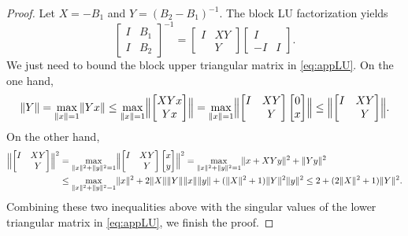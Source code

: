 \documentclass[10pt,a4paper]{amsart}
\providecommand{\Bignorm}[1]{\Bigl\lVert#1\Bigr\rVert}
\providecommand{\norm}[1]{\lVert#1\rVert}
\begin{document}
\begin{proof}
Let $X=-B_{1}$ and $Y=(B_{2}-B_{1})^{-1}$. The block LU factorization yields  
\begin{equation}
    \label{eq:appLU}
    \begin{bmatrix}
        I & B_{1} \\ 
        I & B_{2}
    \end{bmatrix}^{-1}
    = 
    \begin{bmatrix}
        I & XY \\  & Y
    \end{bmatrix}
    \begin{bmatrix}
        I & \\ -I & I
    \end{bmatrix}.
\end{equation}
We just need to bound the block upper triangular matrix in \cref{eq:appLU}.
On the one hand,
\begin{equation*}
    \norm{Y} = \max_{\norm{x}=1}\norm{Yx} \leq \max_{\norm{x}=1}\Bignorm{\begin{bmatrix}
        XYx\\ Yx
    \end{bmatrix}}  = \max_{\norm{x}=1}\Bignorm{\begin{bmatrix}
        I & XY \\ 
        & Y
    \end{bmatrix} \begin{bmatrix}
        0\\ x
    \end{bmatrix}} \leq \Bignorm{\begin{bmatrix}
        I & XY \\ 
        & Y
    \end{bmatrix} }.
\end{equation*} 
On the other hand, 
\begin{equation*}
    \begin{aligned}
        \Bignorm{\begin{bmatrix}
        I & XY \\ 
        & Y
    \end{bmatrix}}^{2} 
    &= \max_{\norm{x}^{2}+\norm{y}^{2}=1}
    \Bignorm{\begin{bmatrix}
        I & XY \\ 
        & Y
    \end{bmatrix}\begin{bmatrix}
        x\\ y
    \end{bmatrix}}^{2}
    = \max_{\norm{x}^{2}+\norm{y}^{2}=1}\norm{x+XYy}^{2}+\norm{Yy}^{2} \\ 
    & \leq \max_{\norm{x}^{2}+\norm{y}^{2}=1}  \norm{x}^{2}+ 2\norm{X}\norm{Y}\norm{x}\norm{y}+(\norm{X}^{2}+1)\norm{Y}^{2}\norm{y}^{2}
    \leq 2+(2\norm{X}^{2}+1)\norm{Y}^{2}.       
    \end{aligned}
\end{equation*}
Combining these two inequalities above with the singular values of the lower triangular matrix in \cref{eq:appLU}, we finish the proof. 
\end{proof}
\end{document}
